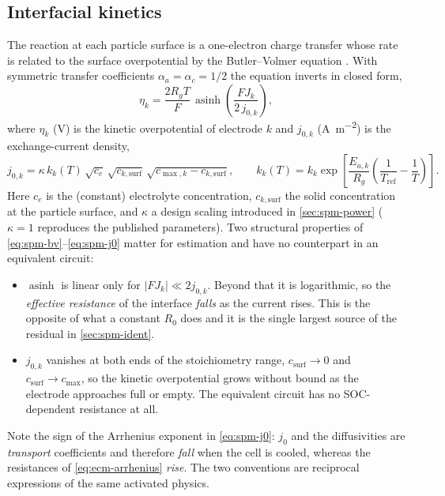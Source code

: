 \subsection{Interfacial kinetics}
The reaction at each particle surface is a one-electron charge transfer whose rate is related to
the surface overpotential by the Butler--Volmer equation \cite{newman2004}. With symmetric
transfer coefficients $\alpha_a = \alpha_c = 1/2$ the equation inverts in closed form,
\begin{equation}
\eta_k = \frac{2R_gT}{F}\,\operatorname{asinh}\!\left(\frac{F J_k}{2\,j_{0,k}}\right),
\label{eq:spm-bv}
\end{equation}
where $\eta_k$ (\si{\volt}) is the kinetic overpotential of electrode $k$ and $j_{0,k}$
(\si{\ampere\per\square\metre}) is the exchange-current density,
\begin{equation}
j_{0,k} = \kappa\,k_k(T)\,\sqrt{c_e}\,\sqrt{c_{k,\mathrm{surf}}}\,
 \sqrt{c_{\max,k}-c_{k,\mathrm{surf}}},
\qquad
k_k(T) = k_k\exp\!\left[\frac{E_{a,k}}{R_g}\left(\frac{1}{T_{\mathrm{ref}}}-\frac1T\right)\right].
\label{eq:spm-j0}
\end{equation}
Here $c_e$ is the (constant) electrolyte concentration, $c_{k,\mathrm{surf}}$ the solid
concentration at the particle surface, and $\kappa$ a design scaling introduced in
\cref{sec:spm-power} ($\kappa = 1$ reproduces the published parameters). Two structural
properties of \eqref{eq:spm-bv}--\eqref{eq:spm-j0} matter for estimation and have no counterpart
in an equivalent circuit:
\begin{itemize}[nosep,leftmargin=*]
\item $\operatorname{asinh}$ is linear only for $|FJ_k|\ll 2j_{0,k}$. Beyond that it is
  logarithmic, so the \emph{effective resistance} of the interface \emph{falls} as the current
  rises. This is the opposite of what a constant $R_0$ does and it is the single largest source of
  the residual in \cref{sec:spm-ident}.
\item $j_{0,k}$ vanishes at both ends of the stoichiometry range, $c_{\mathrm{surf}}\to 0$ and
  $c_{\mathrm{surf}}\to c_{\max}$, so the kinetic overpotential grows without bound as the
  electrode approaches full or empty. The equivalent circuit has no SOC-dependent resistance at
  all.
\end{itemize}
Note the sign of the Arrhenius exponent in \eqref{eq:spm-j0}: $j_0$ and the diffusivities are
\emph{transport} coefficients and therefore \emph{fall} when the cell is cooled, whereas the
resistances of \eqref{eq:ecm-arrhenius} \emph{rise}. The two conventions are reciprocal
expressions of the same activated physics.

